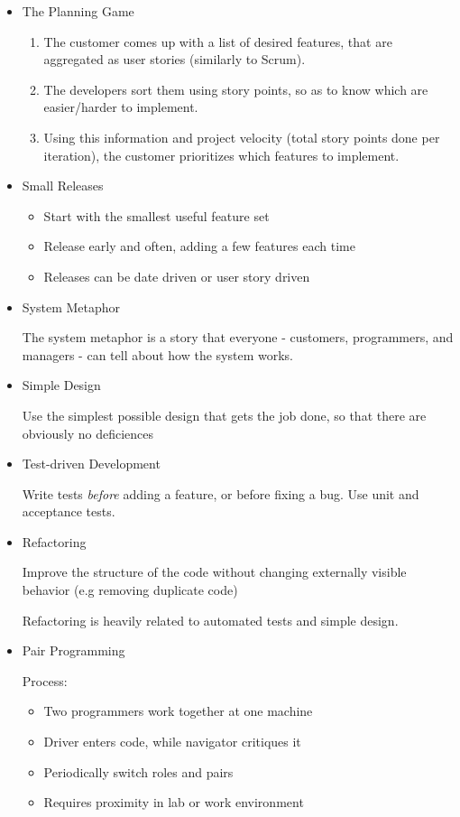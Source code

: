 \documentclass[../ESOF_notes.tex]{subfiles}
\begin{document}
\begin{itemize}
    \item The Planning Game
    \begin{enumerate}
        \item The customer comes up with a list of desired features, that are aggregated as user stories (similarly to Scrum).
        \item The developers sort them using story points, so as to know which are easier/harder to implement.
        \item Using this information and project velocity (total story points done per iteration), the customer prioritizes which features to implement.
    \end{enumerate}
    
    \item Small Releases
    
    \begin{itemize}
        \item Start with the smallest useful feature set
        \item Release early and often, adding a few features each time
        \item Releases can be date driven or user story driven
    \end{itemize}
    \item System Metaphor
    
    The system metaphor is a story that everyone - customers, programmers, and managers - can tell
about how the system works.

    \item Simple Design
    
    Use the simplest possible design that gets the job done, so that there are obviously no deficiences
    \item Test-driven Development
    
    Write tests \textit{before} adding a feature, or before fixing a bug. Use unit and acceptance tests.
    \item Refactoring
    
    Improve the structure of the code without changing externally visible behavior (e.g removing duplicate code)

    Refactoring is heavily related to automated tests and simple design.
    \item Pair Programming
    
    Process:
    \begin{itemize}
        \item Two programmers work together at one machine
        \item Driver enters code, while navigator critiques it 
        \item Periodically switch roles and pairs
        \item Requires proximity in lab or work environment
    \end{itemize}


\end{itemize}
\end{document}
